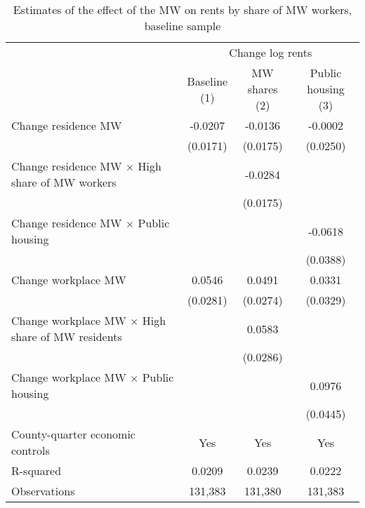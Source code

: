 \begin{table}[hbt!] \centering
    \caption{Estimates of the effect of the MW on rents by share of MW workers, baseline sample}
    \label{tab:heterogeneity}
    \begin{tabular}{@{}lccc@{}}
        \toprule
            & \multicolumn{3}{c}{Change log rents}                                                  \\ \cmidrule(l){2-4} 
            & \shortstack{Baseline\\(1)} 
            & \shortstack{MW shares\\(2)}                                             
            & \shortstack{Public housing\\(3)}                                                      \\ \midrule
        Change residence MW                                     &  -0.0207   &  -0.0136  &  -0.0002   \\
                                                                & (0.0171)  & (0.0175) & (0.0250)  \\
        Change residence MW $\times$ High share of MW workers   &        &  -0.0284  &        \\
                                                                &        & (0.0175) &        \\
        Change residence MW $\times$ Public housing             &        &       &  -0.0618   \\
                                                                &        &       & (0.0388)  \\
        Change workplace MW                                     &  0.0546   &  0.0491  &  0.0331   \\
                                                                & (0.0281)  & (0.0274) & (0.0329)  \\
        Change workplace MW $\times$ High share of MW residents &        &  0.0583  &        \\
                                                                &        & (0.0286) &        \\
        Change workplace MW $\times$ Public housing             &        &       &  0.0976   \\
                                                                &        &       & (0.0445)  \\
        County-quarter economic controls                        &  Yes   &  Yes  &   Yes  \\
        R-squared                                               &  0.0209   &  0.0239  &   0.0222  \\
        Observations                                            &  131,383  &  131,380 &   131,383 \\ \bottomrule
    \end{tabular}


\end{table}

